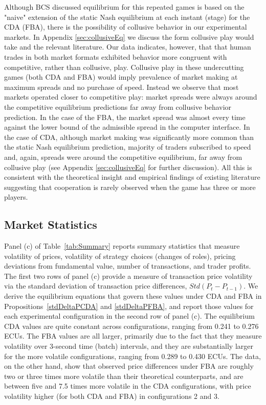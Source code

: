 \documentclass[12pt]{article}
\begin{document}
Although BCS discussed equilibrium for this repeated games is based on the "naive" extension of the static Nash equilibrium at each instant (stage) for the CDA (FBA), there is the possibility of collusive behavior in our experimental markets. 
In Appendix \ref{sec:collusiveEq} we discuss the form collusive play would take and the relevant literature. Our data indicates, however, that that human trades in both market formats exhibited behavior more congruent with competitive, rather than collusive, play. Collusive play in these undercutting games (both CDA and FBA) would imply prevalence of market making at maximum spreads and no purchase of speed. 
Instead we observe that most markets operated closer to competitive play: market spreads were always around the competitive equilibrium predictions far away from collusive behavior prediction. 
In the case of the FBA, the market spread was almost every time against the lower bound of the admissible spread in the computer interface. 
In the case of CDA, although market making was significantly more common than the static Nash equilibrium prediction, majority of traders subscribed to speed and, again, spreads were around the competitive equilibrium, far away from collusive play (see Appendix \ref{sec:collusiveEq} for further discussion). 
All this is consistent with the theoretical insight and empirical findings of existing literature suggesting that cooperation is rarely observed when the game has three or more players.


\subsection{Market Statistics}
\label{marketStatsSection}

Panel (c) of Table~\ref{tab:Summary} reports summary statistics that measure volatility of prices, volatility of strategy choices (changes of roles), pricing deviations from fundamental value, number of transactions, and trader profits. The first two rows of panel (c) provide a measure of transaction price volatility via the standard deviation of transaction price differences, $Std(P_t-P_{t-1})$. We derive the equilibrium equations that govern these values under CDA and FBA in Propositions~\ref{stdDeltaPCDA} and \ref{stdDeltaPFBA}, and report those values for each experimental configuration in the second row of panel (c). The equilibrium CDA values are quite constant across configurations, ranging from 0.241 to 0.276 ECUs. The FBA values are all larger, primarily due to the fact that they measure volatility over 3-second time (batch) intervals, and they are substantially larger for the more volatile configurations, ranging from 0.289 to 0.430 ECUs. The data, on the other hand, show that observed price differences under FBA are roughly two or three times more volatile than their theoretical counterparts, and are between five and 7.5 times more volatile in the CDA configurations, with price volatility higher (for both CDA and FBA) in configurations 2 and 3.
\end{document}
